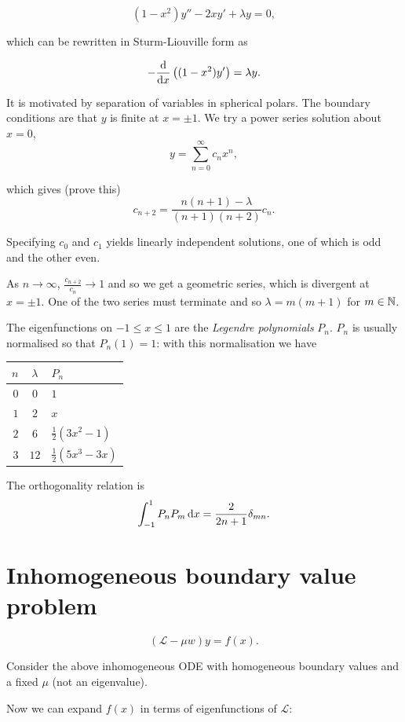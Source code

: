 \documentclass{notes}
\theoremstyle{plain}
\newcommand{\cL}{\mathcal{L}}
\begin{document}
\begin{equation}\label{eq:Legendre}
(1-x^2) y'' - 2 x y' + \lambda y = 0,
\end{equation}

which can be rewritten in Sturm-Liouville form as

\[
- \frac{\mathrm{d}}{\mathrm{d} x} \left( (1-x^2) y' \right) = \lambda y.
\]

It is motivated by separation of variables in spherical polars.  The
boundary conditions are that $y$ is finite at $x = \pm 1$.  We try a power
series solution about $x=0$,
\[
y = \sum_{n=0}^\infty c_n x^n,
\]

which gives (prove this)
\[
c_{n+2} = \frac{n(n+1) - \lambda}{(n+1)(n+2)} c_n.
\]

Specifying $c_0$ and $c_1$ yields linearly independent solutions, one
of which is odd and the other even.

As $n \to \infty$, $\frac{c_{n+2}}{c_n} \to 1$ and so we get a
geometric series, which is divergent at $x= \pm 1$.  One of the two
series must terminate and so $\lambda = m(m+1)$ for $m \in \mathbb{N}$.

The eigenfunctions on $-1 \le x \le 1$ are the \emph{Legendre
  polynomials} $P_n$.  $P_n$ is usually normalised so that $P_n(1) = 1$: with
  this normalisation we have

\begin{center}
\begin{tabular}{r | c | l}
$n$ & $\lambda$ & $P_n$ \\ \hline
$0$ & $0$ & $1$ \\
$1$ & $2$ & $x$ \\
$2$ & $6$ & $\tfrac{1}{2} ( 3 x^2 - 1)$ \\
$3$ & $12$ & $\tfrac{1}{2} (5 x^3 - 3 x)$
\end{tabular}
\end{center}

The orthogonality relation is
\[
\int_{-1}^1 P_n P_m\, \mathrm{d} x = \frac{2}{2 n + 1} \delta_{mn}.
\]

\section{Inhomogeneous boundary value problem}

\[
(\cL - \mu w) y = f(x).
\]

Consider the above inhomogeneous ODE with homogeneous boundary values
and a fixed $\mu$ (not an eigenvalue).

Now we can expand $f(x)$ in terms of eigenfunctions of $\cL$:
\end{document}
